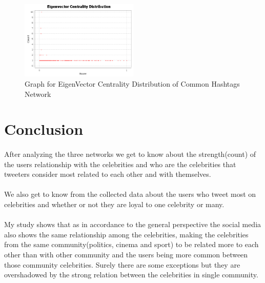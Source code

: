 \documentclass[runningheads,a4paper]{llncs}
\begin{document}
\begin{figure}
\centerline{\includegraphics[width=0.5\textwidth,height=\textheight,keepaspectratio]{hashtags_common_eigenvector_graph.png}}
\caption{Graph for EigenVector Centrality Distribution of Common Hashtags Network}
\vspace{0.1in}
\centerline{}
\end{figure}

\section{Conclusion}

\paragraph{}
After analyzing the three networks we get to know about the strength(count) of the users relationship with the celebrities and who are the celebrities that tweeters consider most related to each other and with themselves.

\paragraph{}
We also get to know from the collected data about the users who tweet most on celebrities and whether or not they are loyal to one celebrity or many.

\paragraph{}
My study shows that as in accordance to the general perspective the social media also shows the same relationship among the celebrities, making the celebrities from the same community(politics, cinema and sport) to be related more to each other than with other community and the users being more common between those community celebrities. Surely there are some exceptions but they are overshadowed by the strong relation between the celebrities in single community.
\end{document}
